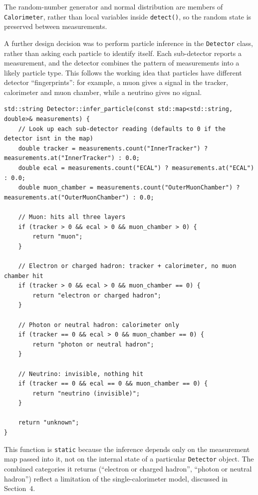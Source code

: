 \documentclass[11pt,a4paper]{article}
\begin{document}
The random-number generator and normal distribution are members of \texttt{Calorimeter}, rather than local variables inside \texttt{detect()}, so the random state is preserved between measurements.

A further design decision was to perform particle inference in the \texttt{Detector} class, rather than asking each particle to identify itself. Each sub-detector reports a measurement, and the detector combines the pattern of measurements into a likely particle type. This follows the working idea that particles have different detector ``fingerprints'': for example, a muon gives a signal in the tracker, calorimeter and muon chamber, while a neutrino gives no signal.

\begin{lstlisting}[caption={Rule-based particle inference from detector measurements.}, label={lst:inferparticle}]
std::string Detector::infer_particle(const std::map<std::string, double>& measurements) {
    // Look up each sub-detector reading (defaults to 0 if the detector isnt in the map)
    double tracker = measurements.count("InnerTracker") ? measurements.at("InnerTracker") : 0.0;
    double ecal = measurements.count("ECAL") ? measurements.at("ECAL") : 0.0;
    double muon_chamber = measurements.count("OuterMuonChamber") ? measurements.at("OuterMuonChamber") : 0.0;

    // Muon: hits all three layers
    if (tracker > 0 && ecal > 0 && muon_chamber > 0) {
        return "muon";
    }

    // Electron or charged hadron: tracker + calorimeter, no muon chamber hit
    if (tracker > 0 && ecal > 0 && muon_chamber == 0) {
        return "electron or charged hadron";
    }

    // Photon or neutral hadron: calorimeter only
    if (tracker == 0 && ecal > 0 && muon_chamber == 0) {
        return "photon or neutral hadron";
    }

    // Neutrino: invisible, nothing hit
    if (tracker == 0 && ecal == 0 && muon_chamber == 0) {
        return "neutrino (invisible)";
    }

    return "unknown";
}
\end{lstlisting}

This function is \texttt{static} because the inference depends only on the measurement map passed into it, not on the internal state of a particular \texttt{Detector} object. The combined categories it returns (``electron or charged hadron'', ``photon or neutral hadron'') reflect a limitation of the single-calorimeter model, discussed in Section~4.
\end{document}
